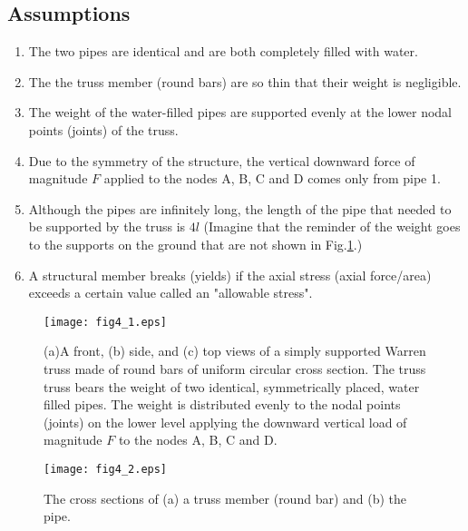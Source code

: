 \documentclass[10pt,a4j]{article}
\begin{document}
\subsection*{Assumptions}
\begin{enumerate}
\item
	The two pipes are identical and are both completely filled with water. 
\item
	The the truss member (round bars) are so thin that their weight is negligible.
\item
	The weight of the water-filled pipes are supported evenly at the lower nodal 
	points (joints) of the truss.
\item
	Due to the symmetry of the structure, the vertical downward force of magnitude 
	$F$ applied to the nodes A, B, C and D comes only from pipe 1.
\item
	Although the pipes are infinitely long, the length of the pipe that needed to be 
	supported by the truss is $4l$ (Imagine that the reminder of the weight goes 
	to the supports on the ground that are not shown in Fig.\ref{fig:fig4_1}.)
\item
	A structural member breaks (yields) if the axial stress (axial force/area) 
	exceeds a certain value called an "allowable stress".
\end{enumerate}
\begin{figure}
	\begin{center}
	\texttt{[image: fig4\_1.eps]} 
	\end{center}
	\caption{
		(a)A front, (b) side, and (c) top views of a simply supported Warren truss made 
		of round bars of uniform circular cross section. 
		The truss truss bears the weight of two identical, symmetrically placed, water filled pipes.
		The weight is distributed evenly to the nodal points (joints) on the lower level 
		applying the downward vertical load of magnitude $F$ to the nodes A, B, C and D.
	}
	\label{fig:fig4_1}
\end{figure}
\begin{figure}
	\begin{center}
	\texttt{[image: fig4\_2.eps]} 
	\end{center}
	\caption{
		The cross sections of (a) a truss member (round bar) and (b) the pipe.  
	}
	\label{fig:fig4_2}
\end{figure}
\end{document}
